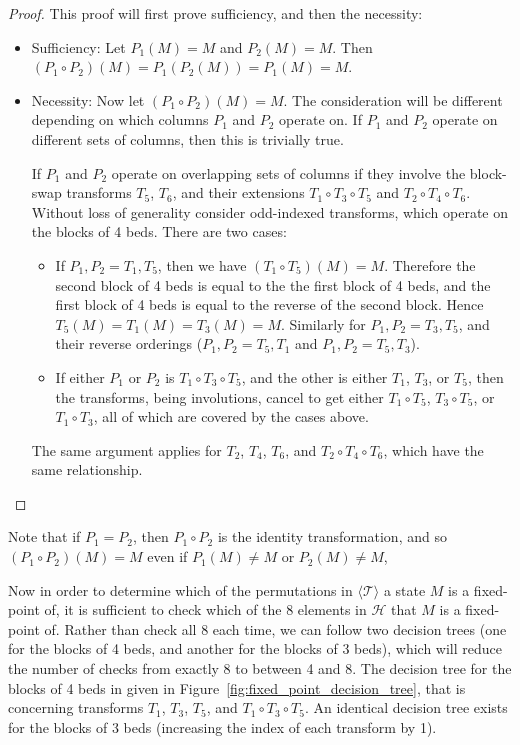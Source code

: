\documentclass{article}
\begin{document}
\begin{proof}
This proof will first prove sufficiency, and then the necessity:

\begin{itemize}
  \item Sufficiency: Let $P_1(M) = M$ and $P_2(M) = M$.
  Then $(P_1 \circ P_2)(M) = P_1(P_2(M)) = P_1(M) = M$.

  \item Necessity: Now let $(P_1 \circ P_2)(M) = M$.
  The consideration will be different depending on which columns $P_1$ and $P_2$
  operate on.
  If $P_1$ and $P_2$ operate on different sets of columns, then this is
  trivially true.

  If $P_1$ and $P_2$ operate on overlapping sets of columns if they involve
  the block-swap transforms $T_5$, $T_6$, and their extensions
  $T_1 \circ T_3 \circ T_5$ and $T_2 \circ T_4\circ T_6$.
  Without loss of generality consider odd-indexed transforms, which operate on
  the blocks of 4 beds. There are two cases:
    \begin{itemize}
        \item If $P_1, P_2 = T_1, T_5$, then we have $(T_1 \circ T_5)(M) = M$.
        Therefore the second block of 4 beds is equal to the the first block of
        4 beds, and the first block of 4 beds is equal to the reverse of the
        second block.
        Hence $T_5(M) = T_1(M) = T_3(M) = M$.
        Similarly for $P_1, P_2 = T_3, T_5$, and their reverse orderings
        ($P_1, P_2 = T_5, T_1$ and $P_1, P_2 = T_5, T_3$).

        \item If either $P_1$ or $P_2$ is $T_1 \circ T_3 \circ T_5$, and the
        other is either $T_1$, $T_3$, or $T_5$, then the transforms, being
        involutions, cancel to get either $T_1 \circ T_5$, $T_3 \circ T_5$, or
        $T_1 \circ T_3$, all of which are covered by the cases above.
      \end{itemize}

  The same argument applies for $T_2$, $T_4$, $T_6$, and
  $T_2 \circ T_4 \circ T_6$, which have the same relationship.
\end{itemize}
\end{proof}

Note that if $P_1 = P_2$, then $P_1 \circ P_2$ is the identity transformation,
and so $(P_1 \circ P_2)(M) = M$ even if $P_1(M) \neq M$ or $P_2(M) \neq M$,

Now in order to determine which of the permutations in
$\langle\mathcal{T}\rangle$ a state $M$ is a fixed-point of, it is sufficient
to check which of the 8 elements in $\mathcal{H}$ that $M$ is a fixed-point of.
Rather than check all 8 each time, we can follow two decision trees (one for
the blocks of 4 beds, and another for the blocks of 3 beds), which will reduce
the number of checks from exactly 8 to between 4 and 8.
The decision tree for the blocks of 4 beds in given in
Figure~\ref{fig:fixed_point_decision_tree}, that is concerning transforms
$T_1$, $T_3$, $T_5$, and $T_1 \circ T_3 \circ T_5$.
An identical decision tree exists for the blocks of 3 beds (increasing the
index of each transform by 1).
\end{document}
